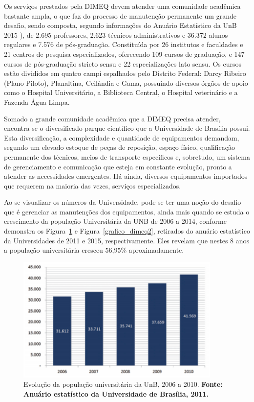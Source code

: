 Os serviços prestados pela DIMEQ devem atender uma comunidade acadêmica bastante ampla, o que faz do processo de manutenção permanente um grande desafio, sendo composta, segundo informações do Anuário Estatístico da UnB 2015 \cite{anuario2015}), de 2.695 professores, 2.623 técnicos-administrativos e 36.372 alunos regulares e 7.576 de pós-graduação. Constituída por 26 institutos e faculdades e 21 centros de pesquisa especializados, oferecendo 109 cursos de graduação, e 147 cursos de pós-graduação stricto sensu e 22 especializações lato sensu. Os cursos estão divididos em quatro campi espalhados pelo Distrito Federal: Darcy Ribeiro (Plano Piloto), Planaltina, Ceilândia e Gama, possuindo diversos órgãos de apoio como o Hospital Universitário, a Biblioteca Central, o Hospital veterinário e a Fazenda Água Limpa.

Somado a grande comunidade acadêmica que a DIMEQ precisa atender, encontra-se o diversificado parque científico que a Universidade de Brasília possui. Esta diversificação, a complexidade e quantidade de equipamentos demandam, segundo \cite{limacastilho2006} um elevado estoque de peças de reposição, espaço físico, qualificação permanente dos técnicos, meios de transporte específicos e, sobretudo, um sistema de gerenciamento e comunicação que esteja em constante evolução, pronto a atender as necessidades emergentes. Há ainda, diversos equipamentos importados que requerem na maioria das vezes, serviços especializados.

Ao se visualizar os números da Universidade, pode se ter uma noção do desafio que é gerenciar as manutenções dos equipamentos, ainda mais quando se estuda o crescimento da população Universitária da UNB de 2006 a 2014, conforme demonstra os Figura~\ref{grafico_dimeq1} e Figura~\ref{grafico_dimeq2}, retirados do anuário estatístico da Universidades de 2011 e 2015, respectivamente. Eles revelam que nestes 8 anos a população universitária cresceu 56,95\% aproximadamente.

\graphicspath{{figuras/}}
\begin{figure}[h]
\centering
\includegraphics[width=0.9\textwidth]{grafico_dimeq1.eps}
\caption{Evolução da população universitária da UnB, 2006 a 2010. \textbf{Fonte: Anuário estatístico da Universidade de Brasília, 2011.}}
\label{grafico_dimeq1}
\end{figure}


